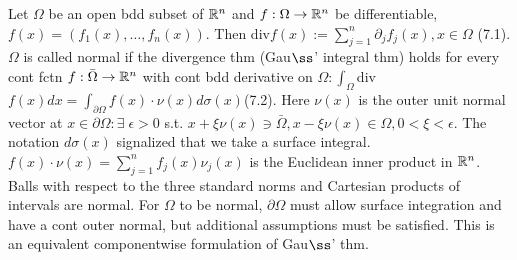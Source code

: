 Let $\Omega$ be an open bdd subset of $\mathbb{R}^n$ and $f: \Omega \rightarrow \mathbb{R}^n$ be differentiable, $f(x) = (f_1(x), \dots, f_n(x))$. Then div$f(x) := \sum_{j=1}^n \partial_j f_j(x), x \in \Omega$ (7.1). $\Omega$ is called normal if the divergence thm (Gau$\ss$' integral thm) holds for every cont fctn $f: \bar{\Omega} \rightarrow \mathbb{R}^n$ with cont bdd derivative on $\Omega: \int_{\Omega}$div$f(x)dx = \int_{\partial \Omega}f(x) \cdot \nu(x) d \sigma(x)$(7.2). Here $\nu(x)$ is the outer unit normal vector at $x \in \partial \Omega: \exists \; \epsilon > 0$ s.t. $x + \xi \nu (x) \ni \bar{\Omega}, x - \xi \nu (x) \in \Omega, 0 < \xi < \epsilon$. 
The notation $d \sigma (x)$ signalized that we take a surface integral. $f(x) \cdot \nu (x) = \sum_{j=1}^n f_j(x)\nu_j(x)$ is the Euclidean inner product in $\mathbb{R}^n$. Balls with respect to the three standard norms and Cartesian products of intervals are normal.  For $\Omega$ to be normal, $\partial \Omega$ must allow surface integration and have a cont outer normal, but additional assumptions must be satisfied.  This is an equivalent componentwise formulation of Gau$\ss$' thm.